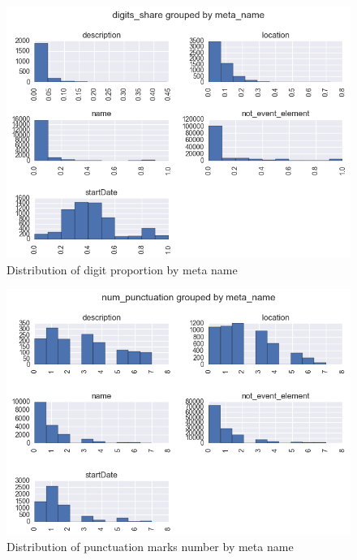 \begin{figure}[h]
\begin{center}
\includegraphics[width=1.0\textwidth]{figures/distrDigitPropByMeta}
\caption{Distribution of digit proportion by meta name}
\label{fig:distrDigitPropByMeta}
\end{center}
\end{figure}

\begin{figure}[h]
\begin{center}
\includegraphics[width=1.0\textwidth]{figures/distrPunctByMeta}
\caption{Distribution of punctuation marks number by meta name}
\label{fig:distrPunctByMeta}
\end{center}
\end{figure}

